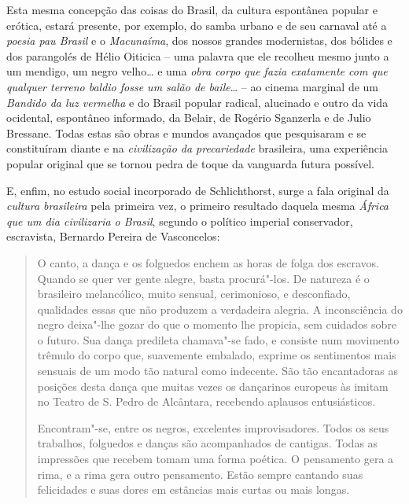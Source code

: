 Esta mesma concepção das coisas do Brasil, da cultura espontânea popular
e erótica, estará presente, por exemplo, do samba urbano e de seu
carnaval até a \emph{poesia pau Brasil} e o \emph{Macunaíma}, dos nossos
grandes modernistas, dos bólides e dos parangolés de Hélio Oiticica --
uma palavra que ele recolheu mesmo junto a um mendigo, um negro velho\ldots{}
e uma \emph{obra corpo} \emph{que fazia exatamente com que qualquer
terreno baldio fosse um salão de baile}\ldots{} -- ao cinema marginal de um
\emph{Bandido da luz vermelha} e do Brasil popular radical, alucinado e
outro da vida ocidental, espontâneo informado, da Belair, de Rogério
Sganzerla e de Julio Bressane. Todas estas são obras e mundos avançados
que pesquisaram e se constituíram diante e na \emph{civilização da
precariedade} brasileira, uma experiência popular original que se tornou
pedra de toque da vanguarda futura possível.

E, enfim, no estudo social incorporado de Schlichthorst, surge a fala
original da \emph{cultura brasileira} pela primeira vez, o primeiro
resultado daquela mesma \emph{África que um dia civilizaria o Brasil},
segundo o político imperial conservador, escravista, Bernardo Pereira de
Vasconcelos:

\begin{quote}
O canto, a dança e os folguedos enchem as horas de folga dos escravos.
Quando se quer ver gente alegre, basta procurá"-los. De natureza é o
brasileiro melancólico, muito sensual, cerimonioso, e desconfiado,
qualidades essas que não produzem a verdadeira alegria. A inconsciência
do negro deixa"-lhe gozar do que o momento lhe propicia, sem cuidados
sobre o futuro. Sua dança predileta chamava"-se fado, e consiste num
movimento trêmulo do corpo que, suavemente embalado, exprime os
sentimentos mais sensuais de um modo tão natural como indecente. São tão
encantadoras as posições desta dança que muitas vezes os dançarinos
europeus às imitam no Teatro de S. Pedro de Alcântara, recebendo
aplausos entusiásticos.

Encontram"-se, entre os negros, excelentes improvisadores. Todos os seus trabalhos, folguedos e danças são acompanhados de cantigas. Todas as impressões que recebem tomam uma forma poética. O pensamento gera a rima, e a rima gera outro pensamento.
Estão sempre cantando suas felicidades e suas dores em estâncias mais
curtas ou mais longas.
\end{quote}

